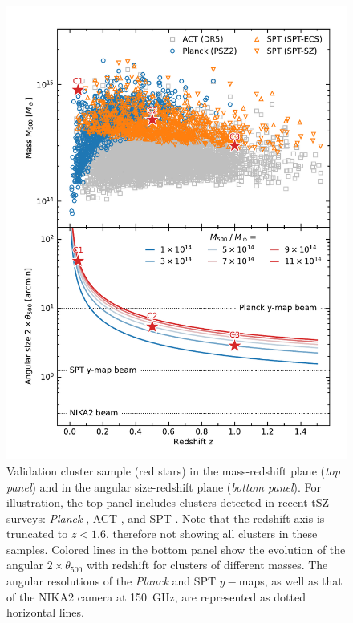 \begin{figure}[tp]
    \centering
    \includegraphics[width=\linewidth]{Figures/validation_sample.pdf}
    \caption{
        Validation cluster sample (red stars) in the mass-redshift plane (\textit{top panel}) and in the angular size-redshift plane (\textit{bottom panel}).
        For illustration, the top panel includes clusters detected in recent tSZ surveys: \textit{Planck} \citep{planck_collaboration_planck_2016-2}, ACT \citep{hilton_atacama_2021}, and SPT \citep{bleem_sptpol_2020,bleem_galaxy_2015}.
        Note that the redshift axis is truncated to $z<1.6$, therefore not showing all clusters in these samples.
        Colored lines in the bottom panel show the evolution of the angular $2\times\theta_{500}$ with redshift for clusters of different masses.
        The angular resolutions of the \textit{Planck} and SPT $y-$maps, as well as that of the NIKA2 camera at 150~GHz, are represented as dotted horizontal lines.
    }
    \label{fig:valid:sample}
\end{figure}

